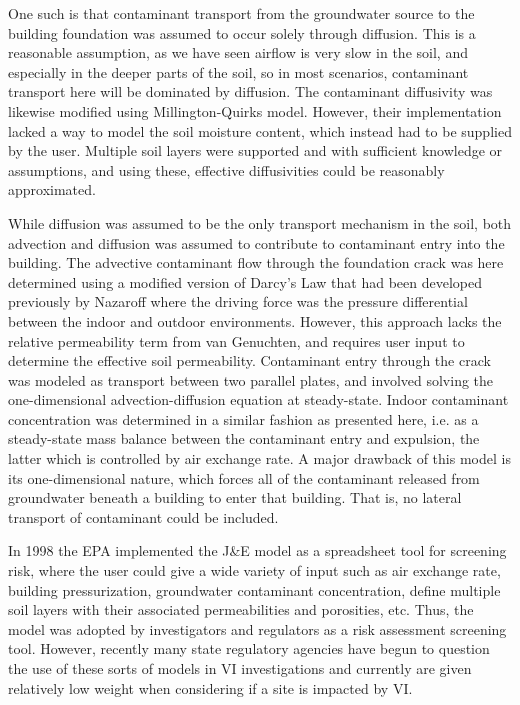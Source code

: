 One such is that contaminant transport from the groundwater source to the building foundation was assumed to occur solely through diffusion.
This is a reasonable assumption, as we have seen airflow is very slow in the soil, and especially in the deeper parts of the soil, so in most scenarios, contaminant transport here will be dominated by diffusion.
The contaminant diffusivity was likewise modified using Millington-Quirks model.
However, their implementation lacked a way to model the soil moisture content, which instead had to be supplied by the user.
Multiple soil layers were supported and with sufficient knowledge or assumptions, and using these, effective diffusivities could be reasonably approximated.\par

While diffusion was assumed to be the only transport mechanism in the soil, both advection and diffusion was assumed to contribute to contaminant entry into the building.
The advective contaminant flow through the foundation crack was here determined using a modified version of Darcy's Law that had been developed previously by Nazaroff\cite{nazaroff_radon_1985} where the driving force was the pressure differential between the indoor and outdoor environments.
However, this approach lacks the relative permeability term from van Genuchten, and requires user input to determine the effective soil permeability.
Contaminant entry through the crack was modeled as transport between two parallel plates, and involved solving the one-dimensional advection-diffusion equation at steady-state.
Indoor contaminant concentration was determined in a similar fashion as presented here, i.e. as a steady-state mass balance between the contaminant entry and expulsion, the latter which is controlled by air exchange rate.
A major drawback of this model is its one-dimensional nature, which forces all of the contaminant released from groundwater beneath a building to enter that building.
That is, no lateral transport of contaminant could be included.\par

In 1998 the EPA implemented the J\&E model as a spreadsheet tool for screening risk, where the user could give a wide variety of input such as air exchange rate, building pressurization, groundwater contaminant concentration, define multiple soil layers with their associated permeabilities and porosities, etc.
Thus, the model was adopted by investigators and regulators as a risk assessment screening tool\cite{u.s._environmental_protection_agency_oswer_2015}.
However, recently many state regulatory agencies have begun to question the use of these sorts of models in VI investigations and currently are given relatively low weight when considering if a site is impacted by VI.\par

